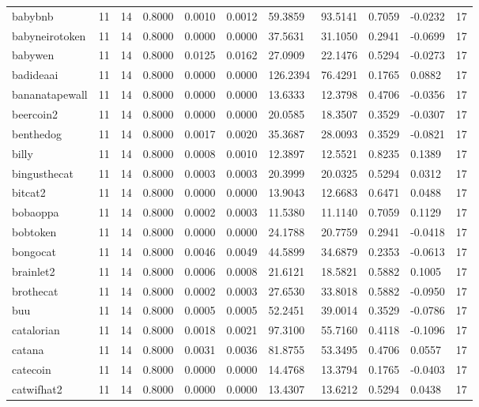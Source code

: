 \begin{table}[htbp]
\begin{tabular}{lllllllllll}
babybnb & 11 & 14 & 0.8000 & 0.0010 & 0.0012 & 59.3859 & 93.5141 & 0.7059 & -0.0232 & 17 \\
babyneirotoken & 11 & 14 & 0.8000 & 0.0000 & 0.0000 & 37.5631 & 31.1050 & 0.2941 & -0.0699 & 17 \\
babywen & 11 & 14 & 0.8000 & 0.0125 & 0.0162 & 27.0909 & 22.1476 & 0.5294 & -0.0273 & 17 \\
badideaai & 11 & 14 & 0.8000 & 0.0000 & 0.0000 & 126.2394 & 76.4291 & 0.1765 & 0.0882 & 17 \\
bananatapewall & 11 & 14 & 0.8000 & 0.0000 & 0.0000 & 13.6333 & 12.3798 & 0.4706 & -0.0356 & 17 \\
beercoin2 & 11 & 14 & 0.8000 & 0.0000 & 0.0000 & 20.0585 & 18.3507 & 0.3529 & -0.0307 & 17 \\
benthedog & 11 & 14 & 0.8000 & 0.0017 & 0.0020 & 35.3687 & 28.0093 & 0.3529 & -0.0821 & 17 \\
billy & 11 & 14 & 0.8000 & 0.0008 & 0.0010 & 12.3897 & 12.5521 & 0.8235 & 0.1389 & 17 \\
bingusthecat & 11 & 14 & 0.8000 & 0.0003 & 0.0003 & 20.3999 & 20.0325 & 0.5294 & 0.0312 & 17 \\
bitcat2 & 11 & 14 & 0.8000 & 0.0000 & 0.0000 & 13.9043 & 12.6683 & 0.6471 & 0.0488 & 17 \\
bobaoppa & 11 & 14 & 0.8000 & 0.0002 & 0.0003 & 11.5380 & 11.1140 & 0.7059 & 0.1129 & 17 \\
bobtoken & 11 & 14 & 0.8000 & 0.0000 & 0.0000 & 24.1788 & 20.7759 & 0.2941 & -0.0418 & 17 \\
bongocat & 11 & 14 & 0.8000 & 0.0046 & 0.0049 & 44.5899 & 34.6879 & 0.2353 & -0.0613 & 17 \\
brainlet2 & 11 & 14 & 0.8000 & 0.0006 & 0.0008 & 21.6121 & 18.5821 & 0.5882 & 0.1005 & 17 \\
brothecat & 11 & 14 & 0.8000 & 0.0002 & 0.0003 & 27.6530 & 33.8018 & 0.5882 & -0.0950 & 17 \\
buu & 11 & 14 & 0.8000 & 0.0005 & 0.0005 & 52.2451 & 39.0014 & 0.3529 & -0.0786 & 17 \\
catalorian & 11 & 14 & 0.8000 & 0.0018 & 0.0021 & 97.3100 & 55.7160 & 0.4118 & -0.1096 & 17 \\
catana & 11 & 14 & 0.8000 & 0.0031 & 0.0036 & 81.8755 & 53.3495 & 0.4706 & 0.0557 & 17 \\
catecoin & 11 & 14 & 0.8000 & 0.0000 & 0.0000 & 14.4768 & 13.3794 & 0.1765 & -0.0403 & 17 \\
catwifhat2 & 11 & 14 & 0.8000 & 0.0000 & 0.0000 & 13.4307 & 13.6212 & 0.5294 & 0.0438 & 17 \\

\end{tabular}
\end{table}
